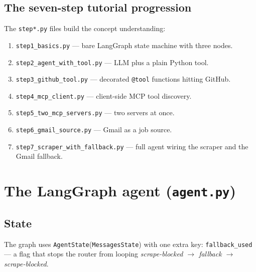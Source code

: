 \documentclass[11pt,a4paper]{article}
\newcommand{\file}[1]{\texttt{\small #1}}
\newcommand{\tool}[1]{\texttt{#1}}
\begin{document}
\subsection{The seven-step tutorial progression}
The \file{step*.py} files build the concept understanding:
\begin{enumerate}
  \item \file{step1\_basics.py} — bare LangGraph state machine with three nodes.
  \item \file{step2\_agent\_with\_tool.py} — LLM plus a plain Python tool.
  \item \file{step3\_github\_tool.py} — decorated \tool{@tool} functions hitting GitHub.
  \item \file{step4\_mcp\_client.py} — client-side MCP tool discovery.
  \item \file{step5\_two\_mcp\_servers.py} — two servers at once.
  \item \file{step6\_gmail\_source.py} — Gmail as a job source.
  \item \file{step7\_scraper\_with\_fallback.py} — full agent wiring the scraper
        and the Gmail fallback.
\end{enumerate}

\section{The LangGraph agent (\file{agent.py})}
\label{sec:agent}

\subsection{State}
The graph uses \tool{AgentState}(\file{MessagesState}) with one extra key:
\tool{fallback\_used} — a flag that stops the router from looping
\emph{scrape-blocked \(\to\) fallback \(\to\) scrape-blocked}.
\end{document}

